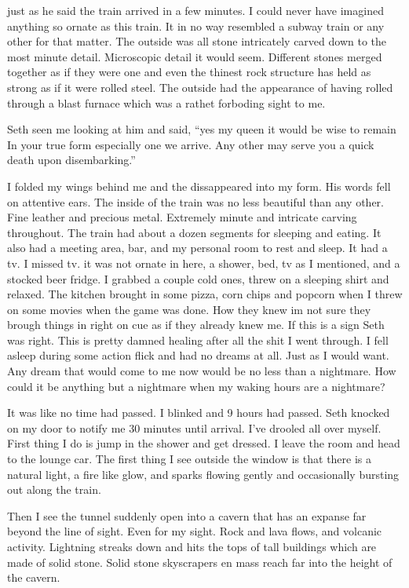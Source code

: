 just as he said the train arrived in a few minutes. I could never have imagined anything so ornate as this train. It in no way resembled a subway train or any other for that matter. The outside was all stone intricately carved down to the most minute detail. Microscopic detail it would seem. Different stones merged together as if they were one and even the thinest rock structure has held as strong as if it were rolled steel. The outside had the appearance of having rolled through a blast furnace which was a rathet forboding sight to me.

Seth seen me looking at him and said, ``yes my queen it would be wise to remain In your true form especially one we arrive. Any other may serve you a quick death upon disembarking.''

I folded my wings behind me and the dissappeared into my form. His words fell on attentive ears. The inside of the train was no less beautiful than any other. Fine leather and precious metal. Extremely minute and intricate carving throughout. The train had about a dozen segments for sleeping and eating. It also had a meeting area, bar, and my personal room to rest and sleep. It had a tv. I missed tv. it was not ornate in here, a shower, bed, tv as I mentioned, and a stocked beer fridge. I grabbed a couple cold ones, threw on a sleeping shirt and relaxed. The kitchen brought in some pizza, corn chips and popcorn when I threw on some movies when the game was done. How they knew im not sure they brough things in right on cue as if they already knew me. If this is a sign Seth was right. This is pretty damned healing after all the shit I went through. I fell asleep during some action flick and had no dreams at all. Just as I would want. Any dream that would come to me now would be no less than a nightmare. How could it be anything but a nightmare when my waking hours are a nightmare?

It was like no time had passed. I blinked and 9 hours had passed. Seth knocked on my door to notify me 30 minutes until arrival. I've drooled all over myself. First thing I do is jump in the shower and get dressed. I leave the room and head to the lounge car. The first thing I see outside the window is that there is a natural light, a fire like glow, and sparks flowing gently and occasionally bursting out along the train. 

Then I see the tunnel suddenly open into a cavern that has an expanse far beyond the line of sight. Even for my sight. Rock and lava flows, and volcanic activity. Lightning streaks down and hits the tops of tall buildings which are made of solid stone. Solid stone skyscrapers en mass reach far into the height of the cavern.


